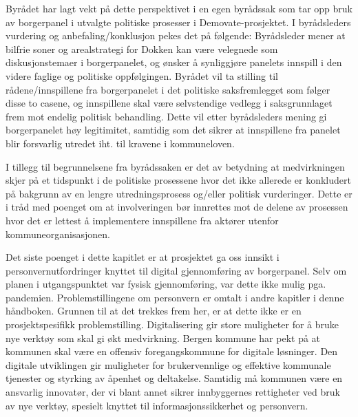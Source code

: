 \documentclass[
  12pt,
  a4paper, 12pt]{article}
\begin{document}
Byrådet har lagt vekt på dette perspektivet i en egen byrådssak som tar opp bruk av borgerpanel i utvalgte politiske prosesser i Demovate-prosjektet. I byrådsleders vurdering og anbefaling/konklusjon pekes det på følgende: Byrådsleder mener at bilfrie soner og arealstrategi for Dokken kan være velegnede som diskusjonstemaer i borgerpanelet, og ønsker å synliggjøre panelets innspill i den videre faglige og politiske oppfølgingen. Byrådet vil ta stilling til rådene/innspillene fra borgerpanelet i det politiske saksfremlegget som følger disse to casene, og innspillene skal være selvstendige vedlegg i saksgrunnlaget frem mot endelig politisk behandling. Dette vil etter byrådsleders mening gi borgerpanelet høy legitimitet, samtidig som det sikrer at innspillene fra panelet blir forsvarlig utredet iht. til kravene i kommuneloven.

I tillegg til begrunnelsene fra byrådssaken er det av betydning at medvirkningen skjer på et tidspunkt i de politiske prosessene hvor det ikke allerede er konkludert på bakgrunn av en lengre utredningsprosess og/eller politisk vurderinger. Dette er i tråd med poenget om at involveringen bør innrettes mot de delene av prosessen hvor det er lettest å implementere innspillene fra aktører utenfor kommuneorganisasjonen.

Det siste poenget i dette kapitlet er at prosjektet ga oss innsikt i personvernutfordringer knyttet til digital gjennomføring av borgerpanel. Selv om planen i utgangspunktet var fysisk gjennomføring, var dette ikke mulig pga. pandemien. Problemstillingene om personvern er omtalt i andre kapitler i denne håndboken. Grunnen til at det trekkes frem her, er at dette ikke er en prosjektspesifikk problemstilling. Digitalisering gir store muligheter for å bruke nye verktøy som skal gi økt medvirkning. Bergen kommune har pekt på at kommunen skal være en offensiv foregangskommune for digitale løsninger. Den digitale utviklingen gir muligheter for brukervennlige og effektive kommunale tjenester og styrking av åpenhet og deltakelse. Samtidig må kommunen være en ansvarlig innovatør, der vi blant annet sikrer innbyggernes rettigheter ved bruk av nye verktøy, spesielt knyttet til informasjonssikkerhet og personvern.
\end{document}
